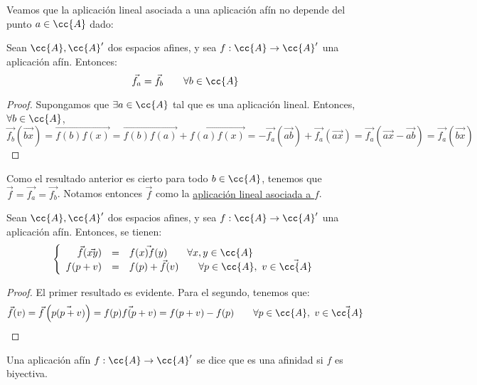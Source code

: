 Veamos que la aplicación lineal asociada a una aplicación afín no depende del punto $a\in \cc{A}$ dado:
\begin{prop}
    Sean $\cc{A}, \cc{A}'$ dos espacios afines, y sea $f:\cc{A}\to \cc{A}'$ una aplicación afín. Entonces:
    \begin{equation*}
        \vec{f_a} = \vec{f_b} \qquad \forall b\in \cc{A}
    \end{equation*}
\end{prop}
\begin{proof}
    Supongamos que $\exists a\in \cc{A}$ tal que
    es una aplicación lineal. Entonces, $\forall b\in \cc{A}$,
    \begin{equation*}
        \vec{f_b}(\vec{bx}) = \vec{f(b)f(x)} = \vec{f(b)f(a)} + \vec{f(a)f(x)} = -\vec{f_a}(\vec{ab}) + \vec{f_a}(\vec{ax})
        = \vec{f_a}(\vec{ax}-\vec{ab}) = \vec{f_a}(\vec{bx})
    \end{equation*}
\end{proof}

Como el resultado anterior es cierto para todo $b\in \cc{A}$, tenemos que $\vec{f}=\vec{f_a} = \vec{f_b}$. Notamos entonces $\vec{f}$ como la \ul{aplicación lineal asociada a $f$}.

\begin{coro}
    Sean $\cc{A}, \cc{A}'$ dos espacios afines, y sea $f:\cc{A}\to \cc{A}'$ una aplicación afín. Entonces, se tienen:
    \begin{equation*}
        \left\{
        \begin{array}{rcl}
            \vec{f}(\vec{xy}) &=& \vec{f(x)f(y)} \qquad \forall x,y\in \cc{A} \\
            f(p+v)&=& f(p)+\vec{f}(v) \qquad \forall p\in \cc{A},~v\in \vec{\cc{A}}
        \end{array}
        \right.
    \end{equation*}
\end{coro}
\begin{proof}
    El primer resultado es evidente. Para el segundo, tenemos que:
    \begin{equation*}
        \vec{f}(v) = \vec{f}\left(\vec{p(p+v)}\right)
        = \vec{f(p)f(p+v)} = f(p+v) - f(p) \qquad \forall p\in \cc{A},~v\in \vec{\cc{A}}
    \end{equation*}
\end{proof}

\begin{definicion}[Afinidad]
    Una aplicación afín $f:\cc{A}\to \cc{A}'$ se dice que es una afinidad si $f$ es biyectiva.
\end{definicion}


